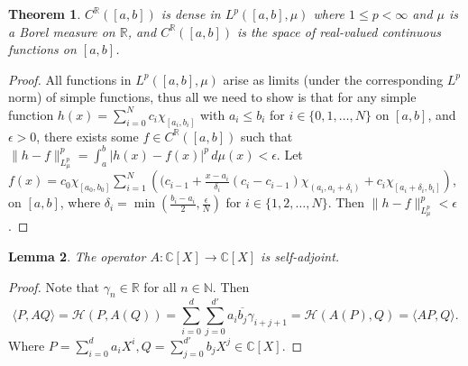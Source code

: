 \documentclass[12pt,oneside]{report}
\newtheorem{thm}{Theorem}[chapter]
\newtheorem{lem}[thm]{Lemma}
\begin{document}

\begin{thm}\label{C-dense-in-Lp}
    $C^{\mathbb{R}}([a,b])$ is dense in $L^{p}([a,b], \mu)$ where $1 \leq p <\infty$ and $\mu$ is a Borel measure on $\mathbb{R}$, and $C^{\mathbb{R}}([a,b])$ is the space of real-valued continuous functions on $[a,b]$.
\end{thm}
\begin{proof}
    All functions in $L^{p}([a,b],\mu)$ arise as limits (under the corresponding $L^{p}$ norm) of simple functions, thus all we need to show is that for any simple function $h(x) = \sum_{i=0}^{N}c_{i}\chi_{[a_{i},b_{i}]}$ with $a_{i} \leq b_{i}$ for $i \in \{ 0,1,\dots,N \}$ on $[a,b]$, and $\epsilon > 0$, there exists some $f \in C^{\mathbb{R}}([a,b])$ such that $\|h - f\|_{L^{p}_{\mu}}^p = \int _{a}^{b} |h(x) - f(x)|^{p} \, d\mu(x) < \epsilon$. Let $f(x) = c_{0}\chi_{[a_{0},b_{0}]} \sum_{i=1}^{N} \left( (c_{i-1} + \frac{x - a_{i}}{\delta_{i}}(c_{i} - c_{i-1})\chi_{(a_{i},a_{i}+\delta_{i})} + c_{i}\chi_{\left[ a_{i} + \delta_{i}, b_{i} \right]} \right)$, on $[a,b]$, where $\delta_{i} = \min\left( \frac{b_{i} - a_{i}}{2}, \frac{\epsilon}{N} \right)$ for $i \in \{ 1,2,\dots,N \}$. Then $\|h - f\|_{L^{p}_{\mu}}^p < \epsilon$.
\end{proof}

\begin{lem}\label{A-selfadj}
    The operator $A: \mathbb{C}[X] \to \mathbb{C}[X]$ is self-adjoint.
\end{lem}
\begin{proof}
    Note that $\gamma_{n} \in \mathbb{R}$ for all $n \in \mathbb{N}$. Then
    $$\langle P, AQ \rangle = \mathcal{H}(P,A(Q)) = \sum_{i=0}^{d} \sum_{j=0}^{d'} a_{i}\overline{b_{j}} \gamma_{i+j+1} = \mathcal{H}(A(P),Q) = \langle AP, Q \rangle.$$
    Where $P = \sum_{i=0}^{d}a_{i}X^{i}, Q = \sum_{j=0}^{d'}b_{j}X^{j} \in \mathbb{C}[X]$.
\end{proof}
\end{document}
